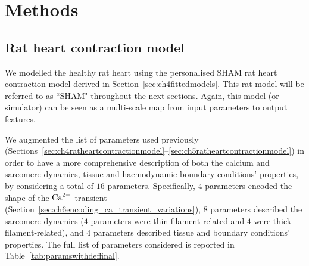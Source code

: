 %
%
%
\section{Methods}\label{sec:ch7methods}


%
%
%
\subsection{Rat heart contraction model}\label{sec:ch7rat_heart_contraction_model}
We modelled the healthy rat heart using the personalised SHAM rat heart contraction model derived in Section~\ref{sec:ch4fittedmodels}. This rat model will be referred to as ``SHAM" throughout the next sections. Again, this model (or simulator) can be seen as a multi-scale map from input parameters to output features.


\vspace{0.2cm}
We augmented the list of parameters used previously (Sections~\ref{sec:ch4ratheartcontractionmodel}--\ref{sec:ch5ratheartcontractionmodel}) in order to have a more comprehensive description of both the calcium and sarcomere dynamics, tissue and haemodynamic boundary conditions' properties, by considering a total of $16$ parameters. Specifically, $4$ parameters encoded the shape of the $\textrm{Ca}^{2+}$ transient (Section~\ref{sec:ch6encoding_ca_transient_variations}), $8$ parameters described the sarcomere dynamics ($4$ parameters were thin filament-related and $4$ were thick filament-related), and $4$ parameters described tissue and boundary conditions' properties. The full list of parameters considered is reported in Table~\ref{tab:paramswithdeffinal}.

